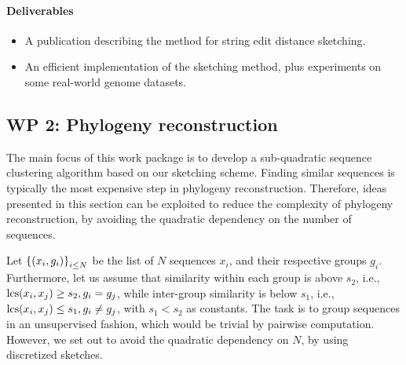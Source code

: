 \paragraph{Deliverables}
\begin{itemize}
\item A publication describing the method for string edit distance sketching. 
\item An efficient implementation of the sketching method, plus experiments on some real-world genome datasets.
\end{itemize}


\subsection{WP 2: Phylogeny reconstruction}
The main focus of this work package is to develop a sub-quadratic sequence clustering algorithm based on our sketching scheme. Finding similar sequences is typically the most expensive step in phylogeny reconstruction. Therefore, ideas presented in this section can be exploited to reduce the complexity of phylogeny reconstruction, by avoiding the quadratic dependency on the number of sequences. 

Let $\left\{(x_i,g_i)\right\}_{i\le N}$ be the list of $N$ sequences $x_i$, and their respective groups $g_i$. Furthermore, let us assume that similarity within each group is above $s_2$, i.e., $\operatorname{\mathrm{lcs}}(x_i,x_j)\ge s_2, g_i=g_j$, while inter-group similarity is below $s_1$, i.e., $\operatorname{\mathrm{lcs}}(x_i, x_j)\le s_1, g_i \neq g_j$, with $s_1 < s_2$ as constants. The task is to group sequences in an unsupervised fashion, which would be trivial by pairwise computation. However, we set out to avoid the quadratic dependency on $N$, by using discretized sketches. 

